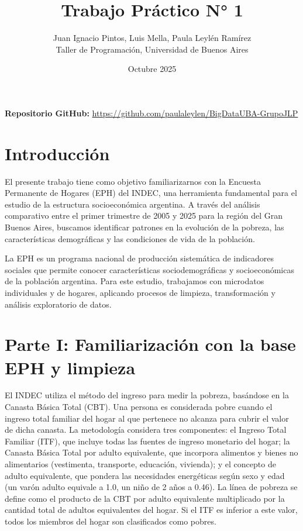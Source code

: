 \documentclass[11pt,a4paper]{article}
\title{\textbf{Trabajo Práctico N° 1}}
\author{
    Juan Ignacio Pintos, Luis Mella, Paula Leylén Ramírez \\
    Taller de Programación, Universidad de Buenos Aires    
}
\date{Octubre 2025}
\begin{document}
\maketitle

\noindent\textbf{Repositorio GitHub:} \url{https://github.com/paulaleylen/BigDataUBA-GrupoJLP}

\section{Introducción}

El presente trabajo tiene como objetivo familiarizarnos con la Encuesta Permanente de Hogares (EPH) del INDEC, una herramienta fundamental para el estudio de la estructura socioeconómica argentina. A través del análisis comparativo entre el primer trimestre de 2005 y 2025 para la región del Gran Buenos Aires, buscamos identificar patrones en la evolución de la pobreza, las características demográficas y las condiciones de vida de la población.

La EPH es un programa nacional de producción sistemática de indicadores sociales que permite conocer características sociodemográficas y socioeconómicas de la población argentina. Para este estudio, trabajamos con microdatos individuales y de hogares, aplicando procesos de limpieza, transformación y análisis exploratorio de datos.

\section{Parte I: Familiarización con la base EPH y limpieza}

El INDEC utiliza el método del ingreso para medir la pobreza, basándose en la Canasta Básica Total (CBT). Una persona es considerada pobre cuando el ingreso total familiar del hogar al que pertenece no alcanza para cubrir el valor de dicha canasta. La metodología considera tres componentes: el Ingreso Total Familiar (ITF), que incluye todas las fuentes de ingreso monetario del hogar; la Canasta Básica Total por adulto equivalente, que incorpora alimentos y bienes no alimentarios (vestimenta, transporte, educación, vivienda); y el concepto de adulto equivalente, que pondera las necesidades energéticas según sexo y edad (un varón adulto equivale a 1.0, un niño de 2 años a 0.46). La línea de pobreza se define como el producto de la CBT por adulto equivalente multiplicado por la cantidad total de adultos equivalentes del hogar. Si el ITF es inferior a este valor, todos los miembros del hogar son clasificados como pobres.
\end{document}
